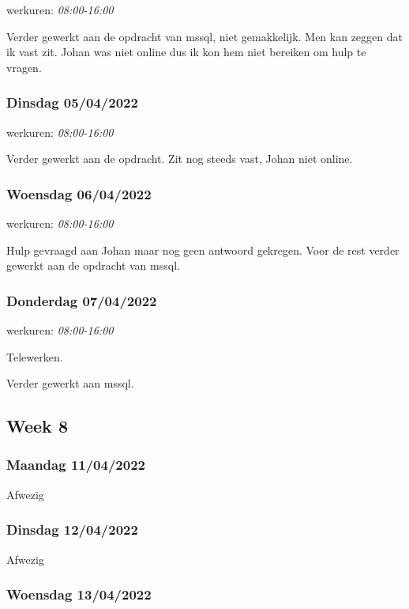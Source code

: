 werkuren: \emph{08:00-16:00}

Verder gewerkt aan de opdracht van \gls{mssql}, niet gemakkelijk. Men kan zeggen dat ik vast zit.  
Johan was niet online dus ik kon hem niet bereiken om hulp te vragen.

\subsubsection{Dinsdag 05/04/2022}

werkuren: \emph{08:00-16:00}

Verder gewerkt aan de opdracht. Zit nog steeds vast, Johan niet online.

\subsubsection{Woensdag 06/04/2022}

werkuren: \emph{08:00-16:00}

Hulp gevraagd aan Johan maar nog geen antwoord gekregen. Voor de rest verder gewerkt aan de opdracht van \gls{mssql}.

\subsubsection{Donderdag 07/04/2022}

werkuren: \emph{08:00-16:00}

Telewerken.

Verder gewerkt aan \gls{mssql}.

\subsection{Week 8}

\subsubsection{Maandag 11/04/2022}

Afwezig

\subsubsection{Dinsdag 12/04/2022}

Afwezig

\subsubsection{Woensdag 13/04/2022}

